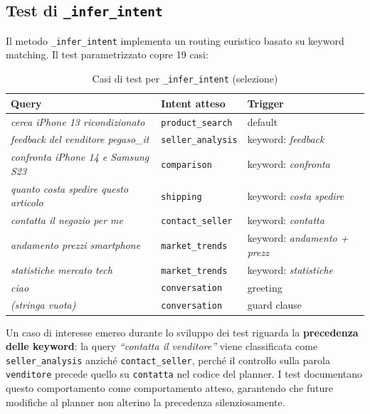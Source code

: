 \subsection{Test di \texttt{\_infer\_intent}}
\label{subsec:test-infer-intent}

Il metodo \texttt{\_infer\_intent} implementa un routing euristico
basato su keyword matching. Il test parametrizzato copre 19 casi:

\begin{table}[htbp]
\centering
\caption{Casi di test per \texttt{\_infer\_intent} (selezione)}
\label{tab:infer-intent-cases}
\begin{tabular}{lll}
\toprule
\textbf{Query} & \textbf{Intent atteso} & \textbf{Trigger} \\
\midrule
\textit{cerca iPhone 13 ricondizionato}      & \texttt{product\_search}  & default \\
\textit{feedback del venditore pegaso\_it}   & \texttt{seller\_analysis} & keyword: \textit{feedback} \\
\textit{confronta iPhone 14 e Samsung S23}   & \texttt{comparison}       & keyword: \textit{confronta} \\
\textit{quanto costa spedire questo articolo}& \texttt{shipping}         & keyword: \textit{costa spedire} \\
\textit{contatta il negozio per me}          & \texttt{contact\_seller}  & keyword: \textit{contatta} \\
\textit{andamento prezzi smartphone}         & \texttt{market\_trends}   & keyword: \textit{andamento + prezz} \\
\textit{statistiche mercato tech}            & \texttt{market\_trends}   & keyword: \textit{statistiche} \\
\textit{ciao}                                & \texttt{conversation}     & greeting \\
\textit{(stringa vuota)}                     & \texttt{conversation}     & guard clause \\
\bottomrule
\end{tabular}
\end{table}

Un caso di interesse emerso durante lo sviluppo dei test riguarda la
\textbf{precedenza delle keyword}: la query
\textit{``contatta il venditore''} viene classificata come
\texttt{seller\_analysis} anziché \texttt{contact\_seller}, perché il
controllo sulla parola \texttt{venditore} precede quello su
\texttt{contatta} nel codice del planner. I test documentano questo
comportamento come comportamento atteso, garantendo che future
modifiche al planner non alterino la precedenza silenziosamente.

